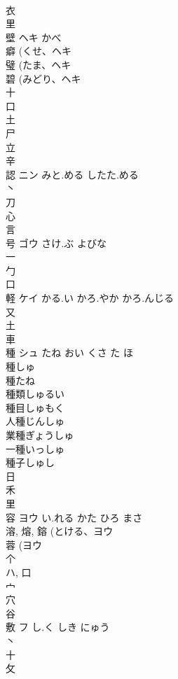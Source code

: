 \documentclass[8pt]{extreport}
\begin{document}
\begin{CJK}{UTF8}{min}
\\	衣 
\\	里 
\\	壁	ヘキ	かべ	
\\	癖 (くせ、ヘキ 
\\	璧 (たま、ヘキ 
\\	碧 (みどり、ヘキ 
\\	十 
\\	口 
\\	土 
\\	尸 
\\	立 
\\	辛 
\\	認	ニン	みと.める したた.める	
\\	丶 
\\	刀 
\\	心 
\\	言 
\\	号	ゴウ	さけ.ぶ よびな	
\\	一 
\\	勹 
\\	口 
\\	軽	ケイ	かる.い かろ.やか かろ.んじる	
\\	又 
\\	土 
\\	車 
\\	種	シュ	たね おい くさ た ほ	
\\	種しゅ 
\\	種たね 
\\	種類しゅるい 
\\	種目しゅもく 
\\	人種じんしゅ 
\\	業種ぎょうしゅ 
\\	一種いっしゅ 
\\	種子しゅし 
\\	日 
\\	禾 
\\	里 
\\	容	ヨウ	い.れる かた ひろ まさ	
\\	溶, 熔, 鎔 (とける、ヨウ 
\\	蓉 (ヨウ 
\\	个 
\\	ハ, 口 
\\	宀 
\\	穴 
\\	谷 
\\	敷	フ	し.く しき にゅう	
\\	丶 
\\	十 
\\	攵 

\end{CJK}
\end{document}
